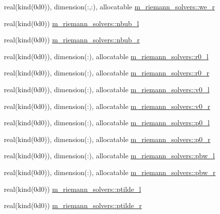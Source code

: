 \begin{Indent}
\begin{DoxyCompactItemize}
\item 
real(kind(0d0)), dimension(\+:,\+:), allocatable \hyperlink{namespacem__riemann__solvers_ab9b568d4ea77b665c1f6cea77144acc8}{m\+\_\+riemann\+\_\+solvers\+::we\+\_\+r}
\item 
real(kind(0d0)) \hyperlink{namespacem__riemann__solvers_afbf6423349d95b7b3472eb84b9ba7f56}{m\+\_\+riemann\+\_\+solvers\+::nbub\+\_\+l}
\item 
real(kind(0d0)) \hyperlink{namespacem__riemann__solvers_a4b6ffaeeaa4365c642ef3a5295635b07}{m\+\_\+riemann\+\_\+solvers\+::nbub\+\_\+r}
\item 
real(kind(0d0)), dimension(\+:), allocatable \hyperlink{namespacem__riemann__solvers_af0757998bd9843f9bb978a600d0ae2b0}{m\+\_\+riemann\+\_\+solvers\+::r0\+\_\+l}
\item 
real(kind(0d0)), dimension(\+:), allocatable \hyperlink{namespacem__riemann__solvers_a132ff53b628e32e8d047d3a3f983b933}{m\+\_\+riemann\+\_\+solvers\+::r0\+\_\+r}
\item 
real(kind(0d0)), dimension(\+:), allocatable \hyperlink{namespacem__riemann__solvers_af425cfd91bc8a567e44b36c9bdbfb2bc}{m\+\_\+riemann\+\_\+solvers\+::v0\+\_\+l}
\item 
real(kind(0d0)), dimension(\+:), allocatable \hyperlink{namespacem__riemann__solvers_a1bf4d8c27c1ed947af13b86a63f5b3aa}{m\+\_\+riemann\+\_\+solvers\+::v0\+\_\+r}
\item 
real(kind(0d0)), dimension(\+:), allocatable \hyperlink{namespacem__riemann__solvers_a2b69a3c582d14aba043c3cb6376335a5}{m\+\_\+riemann\+\_\+solvers\+::p0\+\_\+l}
\item 
real(kind(0d0)), dimension(\+:), allocatable \hyperlink{namespacem__riemann__solvers_aa7deddacb25e873c573761963f680efc}{m\+\_\+riemann\+\_\+solvers\+::p0\+\_\+r}
\item 
real(kind(0d0)), dimension(\+:), allocatable \hyperlink{namespacem__riemann__solvers_a31ac5fad05a69c3c0c76fbdc872f5494}{m\+\_\+riemann\+\_\+solvers\+::pbw\+\_\+l}
\item 
real(kind(0d0)), dimension(\+:), allocatable \hyperlink{namespacem__riemann__solvers_af14a2b29ba2692adfb1ed257e91482e8}{m\+\_\+riemann\+\_\+solvers\+::pbw\+\_\+r}
\item 
real(kind(0d0)) \hyperlink{namespacem__riemann__solvers_abeca9cdf8ede1fe479660ab70ff789c7}{m\+\_\+riemann\+\_\+solvers\+::ptilde\+\_\+l}
\item 
real(kind(0d0)) \hyperlink{namespacem__riemann__solvers_addd3d84b7a9bae473b0c17744d5cac31}{m\+\_\+riemann\+\_\+solvers\+::ptilde\+\_\+r}
\end{DoxyCompactItemize}
\end{Indent}
